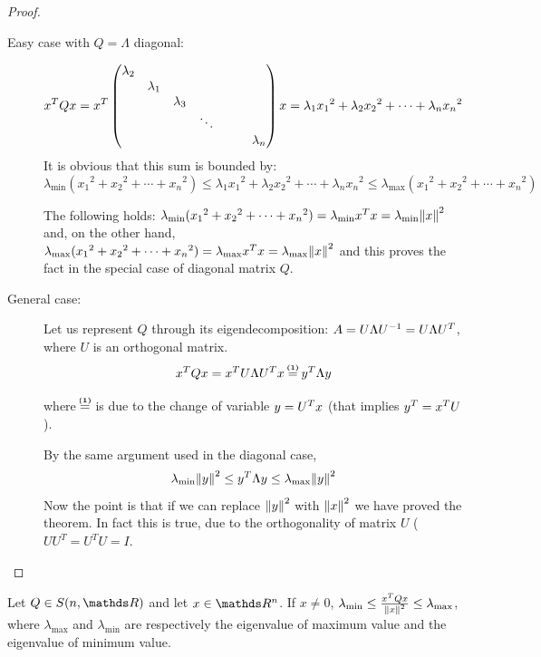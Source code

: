 \documentclass[ComputationalMathematics.tex]{subfiles}
\begin{document}
\begin{proof}~\\
  \begin{description}
    \item[{\sc Easy case with $Q = \Lambda$ diagonal:}]
    
      $${x}^{T}Qx = {x}^{T} \begin{pmatrix}
    \lambda_2\\
    &\lambda_1\\
    &&\lambda_3\\
    &&& \ddots\\
    &&&&&&\lambda_n\\
    \end{pmatrix}
    x = \lambda_1 {x_1}^2 + \lambda_2 {x_2}^2 + \cdots + \lambda_n {x_n}^2$$
  It is obvious that this sum is bounded by:
  \[
    \lambda_{\text{min}} ({x_1}^2 +{x_2}^2 + \cdots + {x_n}^2) \le  \lambda_1 {x_1}^2 + \lambda_2 {x_2}^2 + \cdots + \lambda_n {x_n}^2 \le \lambda_{\text{max}} ({x_1}^2 +{x_2}^2 + \cdots + {x_n}^2)
  \]

      The following holds: $ \lambda_{\text{min}} ({x_1}^2 +{x_2}^2 + \cdots + {x_n}^2) =  \lambda_{\text{min}} {x}^{T} x =  \lambda_{\text{min}} {\left\lVert x\right\rVert}^2$ and, on the other hand, $ \lambda_{\text{max}} ({x_1}^2 +{x_2}^2 + \cdots + {x_n}^2) =  \lambda_{\text{max}} {x}^{T} x =  \lambda_{\text{max}} {\left\lVert x\right\rVert}^2$ and this proves the fact in the special case of diagonal matrix $Q$.
    \item[{\sc General case:}]
      Let us represent $Q$ through its eigendecomposition: $A = U \Lambda {U}^{-1} = U \Lambda {U}^{T}$, where $U$ is an orthogonal matrix.
      $$\tr{x}Qx = \tr{x} U \Lambda \tr{U} x \numeq{(1)} \tr{y} \Lambda y$$

      where $\numeq{(1)}$ is due to the change of variable $y = {U}^{T} x$ (that implies ${y}^{T} = {x}^{T} U$).

      By the same argument used in the diagonal case,
      $$\lambda_{\text{min}} {\left\lVert y\right\rVert}^2 \le {y}^{T} \Lambda y \le \lambda_{\text{max}} {\left\lVert y\right\rVert}^2$$
      Now the point is that if we can replace ${\left\lVert y\right\rVert}^2$ with ${\left\lVert x\right\rVert}^2$ we have proved the theorem.
      In fact this is true, due to the orthogonality of matrix $U$ ( $UU^T = U^TU = I$.
  \end{description}
\end{proof}

\begin{corollary}
  Let $Q \in S(n, \R)$ and let $x \in \R^n$. If $x \neq 0$, $\lambda_{\text{min}} \le \frac{{x}^{T}Qx}{{\left\lVert x\right\rVert}^2} \le \lambda_{\text{max}}$, where $\lambda_{\text{max}}$ and $\lambda_{\text{min}}$ are respectively the eigenvalue of maximum value and the eigenvalue of minimum value.
\end{corollary}
\end{document}
